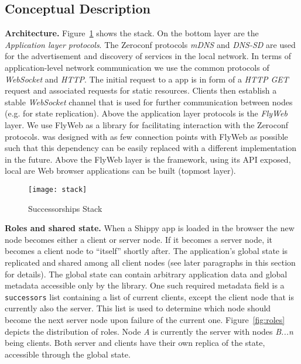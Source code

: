 \subsection{Conceptual Description}
\label{sub:approach_conceptual_description}

\textbf{Architecture.} 
Figure~\ref{fig:stack} shows the \APIName stack.
On the bottom layer are the \textit{Application layer protocols}.
The Zeroconf protocols \textit{mDNS} and \textit{DNS-SD} are used for the advertisement and discovery of \APIshort services in the local network. 
In terms of application-level network communication we use the common protocols of \textit{WebSocket} and \textit{HTTP}. 
The initial request to a \APIshort app is in form of a \textit{HTTP GET} request and associated requests for static resources.  Clients then establish a stable \textit{WebSocket} channel that is used for further communication between nodes (e.g. for state replication). 
Above the application layer protocols is the \textit{FlyWeb} layer. 
We use FlyWeb as a library for facilitating interaction with the Zeroconf protocols. 
\APIName was designed with as few connection points with FlyWeb as possible such that this dependency can be easily replaced with a different implementation in the future. 
Above the FlyWeb layer is the \textit{\APIName} framework, using its API exposed, local are Web browser applications can be built (topmost layer).

\begin{figure}[h]
    \centering
    \texttt{[image: stack]}
    \caption{Successorships Stack}
    \label{fig:stack}
\end{figure}

\noindent\textbf{Roles and shared state.} When a Shippy app is loaded in the browser the new node becomes either a client or server node. 
If it becomes a server node, it becomes a client node to ``itself'' shortly after. 
The application's global state is replicated and shared among all client nodes (see later paragraphs in this section for details). 
The global state can contain arbitrary application data and global metadata accessible only by the \APIshort library. 
One such required metadata field is a \texttt{successors} list containing a list of current clients, except the client node that is currently also the server. 
This list is used to determine which node should become the next server node upon failure of the current one. 
Figure~\ref{fig:roles} depicts the distribution of roles. Node \textit{A} is currently the server with nodes \textit{B...n} being clients. 
Both server and clients have their own replica of the state, accessible through the global state.

